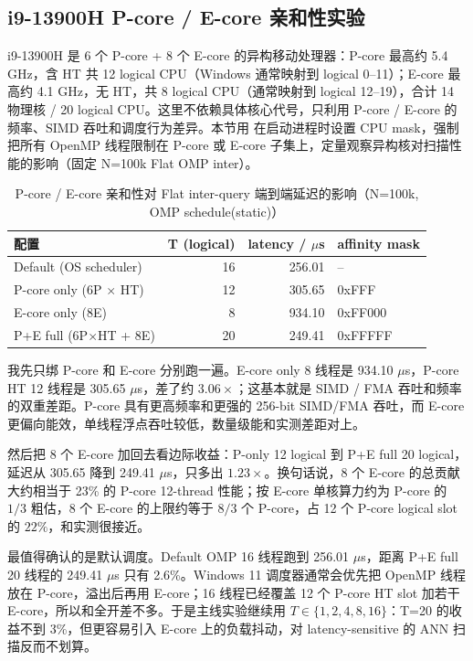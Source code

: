 \documentclass[a4paper,11pt,UTF8]{ctexart}
\newcommand{\code}[1]{\texttt{\detokenize{#1}}}
\begin{document}
\subsection{i9-13900H P-core / E-core 亲和性实验}\label{sec:pe_affinity}

i9-13900H 是 6 个 P-core + 8 个 E-core 的异构移动处理器：P-core 最高约 5.4 GHz，含 HT 共 12 logical CPU（Windows 通常映射到 logical 0--11）；E-core 最高约 4.1 GHz，无 HT，共 8 logical CPU（通常映射到 logical 12--19），合计 14 物理核 / 20 logical CPU。这里不依赖具体核心代号，只利用 P-core / E-core 的频率、SIMD 吞吐和调度行为差异。本节用 \code{cmd /AFFINITY} 在启动进程时设置 CPU mask，强制把所有 OpenMP 线程限制在 P-core 或 E-core 子集上，定量观察异构核对扫描性能的影响（固定 N=100k Flat OMP inter）。

\begin{table}[H]
  \centering\small
  \begin{tabular}{lrrl}
    \toprule
    配置 & T (logical) & latency / $\mu$s & affinity mask \\
    \midrule
    Default (OS scheduler)        & 16 & 256.01 & -- \\
    P-core only (6P $\times$ HT)   & 12 & 305.65 & 0xFFF \\
    E-core only (8E)               &  8 & 934.10 & 0xFF000 \\
    P+E full (6P$\times$HT + 8E)   & 20 & 249.41 & 0xFFFFF \\
    \bottomrule
  \end{tabular}
  \caption{P-core / E-core 亲和性对 Flat inter-query 端到端延迟的影响（N=100k, OMP schedule(static)）}
  \label{tab:pe_affinity}
\end{table}

我先只绑 P-core 和 E-core 分别跑一遍。E-core only 8 线程是 934.10 $\mu$s，P-core HT 12 线程是 305.65 $\mu$s，差了约 $3.06\times$；这基本就是 SIMD / FMA 吞吐和频率的双重差距。P-core 具有更高频率和更强的 256-bit SIMD/FMA 吞吐，而 E-core 更偏向能效，单线程浮点吞吐较低，数量级能和实测差距对上。

然后把 8 个 E-core 加回去看边际收益：P-only 12 logical 到 P+E full 20 logical，延迟从 305.65 降到 249.41 $\mu$s，只多出 $1.23\times$。换句话说，8 个 E-core 的总贡献大约相当于 23\% 的 P-core 12-thread 性能；按 E-core 单核算力约为 P-core 的 $1/3$ 粗估，8 个 E-core 的上限约等于 $8/3$ 个 P-core，占 12 个 P-core logical slot 的 $22\%$，和实测很接近。

最值得确认的是默认调度。Default OMP 16 线程跑到 256.01 $\mu$s，距离 P+E full 20 线程的 249.41 $\mu$s 只有 2.6\%。Windows 11 调度器通常会优先把 OpenMP 线程放在 P-core，溢出后再用 E-core；16 线程已经覆盖 12 个 P-core HT slot 加若干 E-core，所以和全开差不多。于是主线实验继续用 $T \in \{1,2,4,8,16\}$：T=20 的收益不到 3\%，但更容易引入 E-core 上的负载抖动，对 latency-sensitive 的 ANN 扫描反而不划算。
\end{document}
